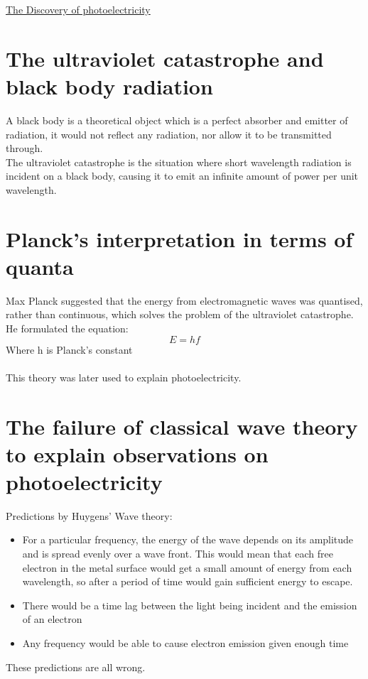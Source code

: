 \documentclass[12pt]{article}
\begin{document}
\begin{center}
\underline{\huge The Discovery of photoelectricity}
\end{center}
\section{The ultraviolet catastrophe and black body radiation}
A black body is a theoretical object which is a perfect absorber and emitter of radiation, it would not reflect any radiation, nor allow it to be transmitted through.\\
The ultraviolet catastrophe is the situation where short wavelength radiation is incident on a black body, causing it to emit an infinite amount of power per unit wavelength.
\section{Planck's interpretation in terms of quanta}
Max Planck suggested that the energy from electromagnetic waves was quantised, rather than continuous, which solves the problem of the ultraviolet catastrophe. He formulated the equation:
$$E=hf$$
Where h is Planck's constant\\
\\
This theory was later used to explain photoelectricity.
\section{The failure of classical wave theory to explain observations on photoelectricity}
Predictions by Huygens' Wave theory:
\begin{itemize}
\item For a particular frequency, the energy of the wave depends on its amplitude and is spread evenly over a wave front. This would mean that each free electron in the metal surface would get a small amount of energy from each wavelength, so after a period of time would gain sufficient energy to escape.
\item There would be a time lag between the light being incident and the emission of an electron
\item Any frequency would be able to cause electron emission given enough time
\end{itemize}
These predictions are all wrong.
\end{document}
